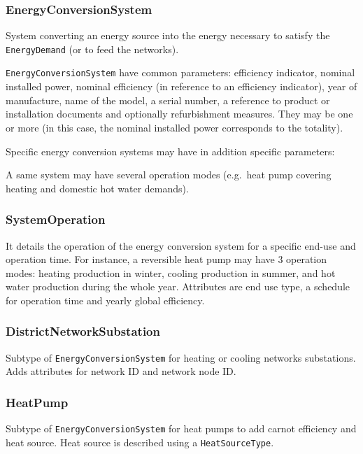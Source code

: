 \documentclass[a4paper,12pt]{article}
\begin{document}
\subsubsection{EnergyConversionSystem}\label{energyconversionsystem}

System converting an energy source into the energy necessary to satisfy
the \lstinline!EnergyDemand! (or to feed the networks).

\lstinline!EnergyConversionSystem! have common parameters: efficiency
indicator, nominal installed power, nominal efficiency (in reference to
an efficiency indicator), year of manufacture, name of the model, a
serial number, a reference to product or installation documents and
optionally refurbishment measures. They may be one or more (in this
case, the nominal installed power corresponds to the totality).

Specific energy conversion systems may have in addition specific
parameters:

A same system may have several operation modes (e.g.~heat pump covering
heating and domestic hot water demands).

\subsubsection{SystemOperation}\label{systemoperation}

It details the operation of the energy conversion system for a specific
end-use and operation time. For instance, a reversible heat pump may
have 3 operation modes: heating production in winter, cooling production
in summer, and hot water production during the whole year. Attributes
are end use type, a schedule for operation time and yearly global
efficiency.

\subsubsection{DistrictNetworkSubstation}\label{districtnetworksubstation}

Subtype of \lstinline!EnergyConversionSystem! for heating or cooling
networks substations. Adds attributes for network ID and network node
ID.

\subsubsection{HeatPump}\label{heatpump}

Subtype of \lstinline!EnergyConversionSystem! for heat pumps to add
carnot efficiency and heat source. Heat source is described using a
\lstinline!HeatSourceType!.
\end{document}
